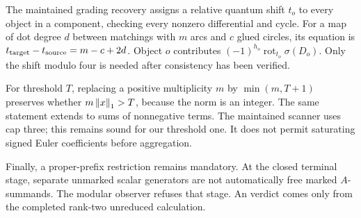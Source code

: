 The maintained grading recovery assigns a relative quantum shift $t_o$ to
every object in a component, checking every nonzero differential and cycle.
For a map of dot degree $d$ between matchings with $m$ arcs and $c$ glued
circles, its equation is $t_{\rm target}-t_{\rm source}=m-c+2d$.
Object $o$ contributes $(-1)^{h_o}\operatorname{rot}_{t_o}\sigma(D_o)$.
Only the shift modulo four is needed after consistency has been verified.

For threshold $T$, replacing a positive multiplicity $m$ by
$\min(m,T+1)$ preserves whether $m\left\lVert x\right\rVert_1>T$, because the norm is an integer.
The same statement extends to sums of nonnegative terms. The maintained
scanner uses cap three; this remains sound for our threshold one. It does not
permit saturating signed Euler coefficients before aggregation.

Finally, a proper-prefix restriction remains mandatory. At the closed terminal
stage, separate unmarked scalar generators are not automatically free marked
$A$-summands. The modular observer refuses that stage. An  verdict
comes only from the completed rank-two unreduced calculation.
